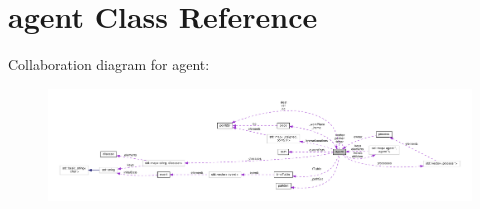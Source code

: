 \hypertarget{classagent}{}\section{agent Class Reference}
\label{classagent}


Collaboration diagram for agent\+:
\nopagebreak
\begin{figure}[H]
\begin{center}
\leavevmode
\includegraphics[width=350pt]{classagent__coll__graph}
\end{center}
\end{figure}
